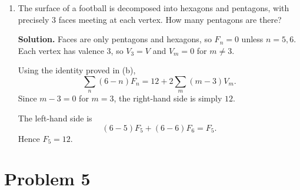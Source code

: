 \documentclass[12pt,a4paper]{article}
\theoremstyle{plain}
\theoremstyle{definition}      %
\begin{document}
\begin{enumerate}[label=\textnormal{(\alph*)}]
	Similarly,
	\[
	\sum_m (m-3)V_m
	= \sum_m mV_m - 3\sum_m V_m
	= 2E - 3V,
	\]
	because $\sum_m mV_m = 2E$ and $\sum_m V_m = V$.
	
	Hence
	\[
	12 + 2\sum_m (m-3)V_m
	= 12 + 2(2E - 3V)
	= 12 + 4E - 6V.
	\]
	
	Using Euler’s formula $V - E + F = 2$ on the sphere, we have
	$F = 2 - V + E$. Thus
	\[
	6F - 2E
	= 6(2 - V + E) - 2E
	= 12 - 6V + 4E.
	\]
	Thus
	\[
	\sum_n (6-n)F_n = 12 + 2\sum_m (m-3)V_m.
	\]
	
	If each face has at least 3 edges and each vertex has valence at least 3,
	then $(m-3)V_m \ge 0$ for all $m$, so
	\[
	\sum_n (6-n)F_n \ge 12.
	\]
	Now
	\[
	\sum_n (6-n)F_n
	= 3F_3 + 2F_4 + F_5 + 0\cdot F_6 
	+ \sum_{n\ge 7} (6-n)F_n.
	\]
	For $n \ge 6$, the terms $(6-n)$ are nonpositive, so
	\[
	3F_3 + 2F_4 + F_5 \ge 12.
	\]
	
	\item
	The surface of a football is decomposed into hexagons and pentagons,
	with precisely $3$ faces meeting at each vertex.
	How many pentagons are there?
	
	\medskip
	\textbf{Solution.}
	Faces are only pentagons and hexagons, so $F_n=0$ unless $n=5,6$.
	Each vertex has valence $3$, so $V_3 = V$ and $V_m = 0$ for $m \ne 3$.
	
	Using the identity proved in (b),
	\[
	\sum_n (6-n)F_n = 12 + 2\sum_m (m-3)V_m.
	\]
	Since $m-3=0$ for $m=3$, the right-hand side is simply $12$.
	
	The left-hand side is
	\[
	(6-5)F_5 + (6-6)F_6 = F_5.
	\]
	Hence $F_5 = 12$.
\end{enumerate}

	\section*{Problem 5}
	
\end{document}
